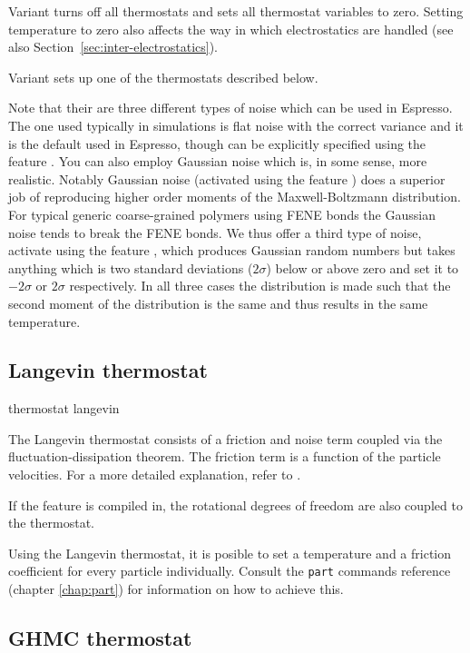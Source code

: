 Variant  turns off all thermostats and sets all thermostat 
variables to zero. Setting temperature to zero also affects the way in which 
electrostatics are handled (see also Section~\ref{sec:inter-electrostatics}).

Variant  sets up one of the thermostats described below.

Note that their are three different types of noise which can be used in
Espresso. The one used typically in simulations is flat noise with the
correct variance and it is the default used in Espresso, though can be
explicitly specified using the feature . You can also
employ Gaussian noise which is, in some sense, more realistic. Notably
Gaussian noise (activated using the feature ) does
a superior job of reproducing higher order moments of the Maxwell-Boltzmann
distribution. For typical generic
coarse-grained polymers using FENE bonds the Gaussian noise tends to break
the FENE bonds. We thus offer a third type of noise, activate using the
feature , which produces Gaussian random numbers
but takes anything which is two standard deviations ($2\sigma$) below or above zero
and set it to $-2\sigma$ or $2\sigma$ respectively. In all three cases the 
distribution is made such that the second moment of the distribution is
the same and thus results in the same temperature.

\subsection{Langevin thermostat}
\begin{essyntax}
  thermostat langevin  
\end{essyntax}

The Langevin thermostat consists of a friction and noise term coupled
via the fluctuation-dissipation theorem. The friction term is a
function of the particle velocities. For a more detailed explanation,
refer to \cite{grest86a}.

If the feature  is compiled in, the rotational
degrees of freedom are also coupled to the thermostat.

Using the Langevin thermostat, it is posible to set a temperature and
a friction coefficient for every particle individually. Consult the
\texttt{part} commands reference (chapter \ref{chap:part}) for
information on how to achieve this.

\subsection{GHMC thermostat}

